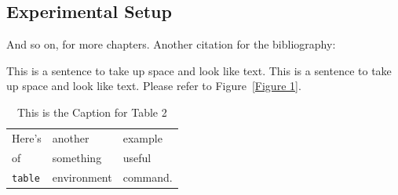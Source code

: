 \documentclass{thesis}
\begin{document}
\subsection{Experimental Setup}
And so on, for more chapters.
Another citation for the bibliography:\cite{anotherbook}

   This is a sentence to take up space and look like text.
   This is a sentence to take up space and look like text.
   Please refer to Figure~\ref{Figure 1}.  %

\begin{table}
\caption{This is the Caption for Table 2}
\label{mytable}
\begin{center}
\begin{tabular}{lll}
Here's	& another 	& example \\
of		& something	& useful \\
\verb+table+ & environment & command. \end{tabular}
\end{center}
\end{table}
\end{document}
